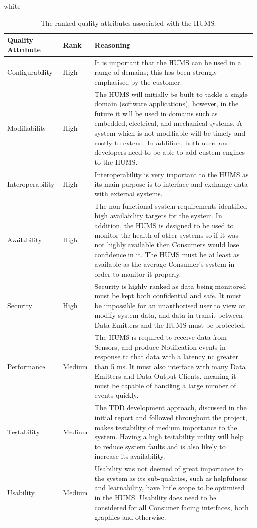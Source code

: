\documentclass[10pt,a4paper]{article}
\newcommand{\xtableformat}[4]{
\begin{table}[ht!]
\centering
  \rowcolors{2}{gray!10} {white}
\begin{tabularx}{\textwidth}{#1}
  \hline
  \rowcolor[gray]{0.9} #2
  \hline
\end{tabularx}
\caption{#3}
\label{#4}
\end{table}}
\begin{document}
\xtableformat{p{2.4cm} p{1.2cm} X}{
\hline
Quality \qquad Attribute & Rank & Reasoning \\
\hline
Configurability & High & It is important that the HUMS can be used in a range of domains; this has been strongly emphasised by the customer. 
\\
Modifiability & High & The HUMS will initially be built to tackle a single domain (software applications), however, in the future it will be used in domains such as embedded, electrical, and mechanical systems. A system which is not modifiable will be timely and costly to extend. In addition, both users and developers need to be able to add custom engines to the HUMS.
\\
Interoperability & High & Interoperability is very important to the HUMS as its main purpose is to interface and exchange data with external systems. 
\\
Availability & High & The non-functional system requirements identified high availability targets for the system. In addition, the HUMS is designed to be used to monitor the health of other systems so if it was not highly available then Consumers would lose confidence in it. The HUMS must be at least as available as the average Consumer's system in order to monitor it properly. 
\\
Security & High & Security is highly ranked as data being monitored must be kept both confidential and safe. It must be impossible for an unauthorised user to view or modify system data, and data in transit between Data Emitters and the HUMS must be protected.
\\
Performance & Medium & The HUMS is required to receive data from Sensors, and produce Notification events in response to that data with a latency no greater than 5 ms. It must also interface with many Data Emitters and Data Output Clients, meaning it must be capable of handling a large number of events quickly.
\\
Testability & Medium & The TDD development approach, discussed in the initial report and followed throughout the project, makes testability of medium importance to the system. Having a high testability utility will help to reduce system faults and is also likely to increase its availability. 
\\
Usability & Medium & Usability was not deemed of great importance to the system as its sub-qualities, such as helpfulness and learnability, have little scope to be optimised in the HUMS. Usability does need to be considered for all Consumer facing interfaces, both graphics and otherwise.
\\
}{The ranked quality attributes associated with the HUMS.}{tab:qualities}
\end{document}
